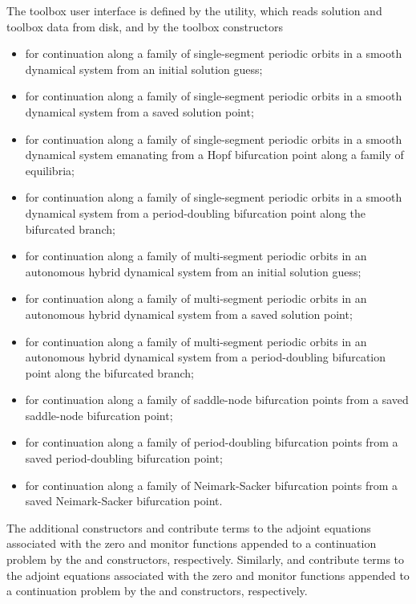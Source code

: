 The toolbox user interface is defined by the  utility, which reads solution and toolbox data from disk, and by the toolbox constructors
\begin{itemize}
\item  {} for continuation along a family of single-segment periodic orbits in a smooth dynamical system from an initial solution guess;
\item {} for continuation along a family of single-segment periodic orbits in a smooth dynamical system from a saved solution point;
\item {} for continuation along a family of single-segment periodic orbits in a smooth dynamical system emanating from a Hopf bifurcation point along a family of equilibria;
\item {} for continuation along a family of single-segment periodic orbits in a smooth dynamical system from a period-doubling bifurcation point along the bifurcated branch;
\item  {} for continuation along a family of multi-segment periodic orbits in an autonomous hybrid dynamical system from an initial solution guess;
\item {} for continuation along a family of multi-segment periodic orbits in an autonomous hybrid dynamical system from a saved solution point;
\item {} for continuation along a family of multi-segment periodic orbits in an autonomous hybrid dynamical system from a period-doubling bifurcation point along the bifurcated branch;
\item {} for continuation along a family of saddle-node bifurcation points from a saved saddle-node bifurcation point;
\item {} for continuation along a family of period-doubling bifurcation points from a saved period-doubling bifurcation point;
\item {} for continuation along a family of Neimark-Sacker bifurcation points from a saved Neimark-Sacker bifurcation point.
\end{itemize}
The additional constructors  and  contribute terms to the adjoint equations associated with the zero and monitor functions appended to a continuation problem by the  and  constructors, respectively. Similarly,  and  contribute terms to the adjoint equations associated with the zero and monitor functions appended to a continuation problem by the  and  constructors, respectively.


